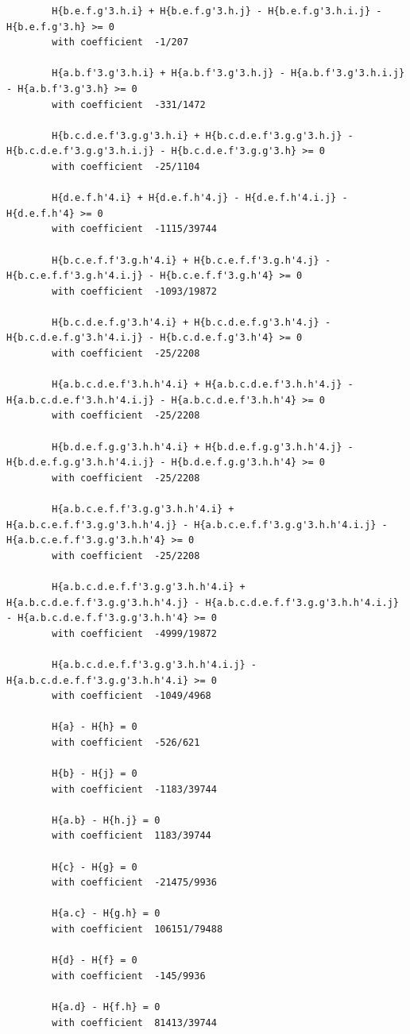 \documentclass[11pt, a4paper]{kybernetika}
\begin{document}
\begin{verbatim}
		H{b.e.f.g'3.h.i} + H{b.e.f.g'3.h.j} - H{b.e.f.g'3.h.i.j} - H{b.e.f.g'3.h} >= 0
		with coefficient  -1/207
		
		H{a.b.f'3.g'3.h.i} + H{a.b.f'3.g'3.h.j} - H{a.b.f'3.g'3.h.i.j} - H{a.b.f'3.g'3.h} >= 0
		with coefficient  -331/1472
		
		H{b.c.d.e.f'3.g.g'3.h.i} + H{b.c.d.e.f'3.g.g'3.h.j} - H{b.c.d.e.f'3.g.g'3.h.i.j} - H{b.c.d.e.f'3.g.g'3.h} >= 0
		with coefficient  -25/1104
		
		H{d.e.f.h'4.i} + H{d.e.f.h'4.j} - H{d.e.f.h'4.i.j} - H{d.e.f.h'4} >= 0
		with coefficient  -1115/39744
		
		H{b.c.e.f.f'3.g.h'4.i} + H{b.c.e.f.f'3.g.h'4.j} - H{b.c.e.f.f'3.g.h'4.i.j} - H{b.c.e.f.f'3.g.h'4} >= 0
		with coefficient  -1093/19872
		
		H{b.c.d.e.f.g'3.h'4.i} + H{b.c.d.e.f.g'3.h'4.j} - H{b.c.d.e.f.g'3.h'4.i.j} - H{b.c.d.e.f.g'3.h'4} >= 0
		with coefficient  -25/2208
		
		H{a.b.c.d.e.f'3.h.h'4.i} + H{a.b.c.d.e.f'3.h.h'4.j} - H{a.b.c.d.e.f'3.h.h'4.i.j} - H{a.b.c.d.e.f'3.h.h'4} >= 0
		with coefficient  -25/2208
		
		H{b.d.e.f.g.g'3.h.h'4.i} + H{b.d.e.f.g.g'3.h.h'4.j} - H{b.d.e.f.g.g'3.h.h'4.i.j} - H{b.d.e.f.g.g'3.h.h'4} >= 0
		with coefficient  -25/2208
		
		H{a.b.c.e.f.f'3.g.g'3.h.h'4.i} + H{a.b.c.e.f.f'3.g.g'3.h.h'4.j} - H{a.b.c.e.f.f'3.g.g'3.h.h'4.i.j} - H{a.b.c.e.f.f'3.g.g'3.h.h'4} >= 0
		with coefficient  -25/2208
		
		H{a.b.c.d.e.f.f'3.g.g'3.h.h'4.i} + H{a.b.c.d.e.f.f'3.g.g'3.h.h'4.j} - H{a.b.c.d.e.f.f'3.g.g'3.h.h'4.i.j} - H{a.b.c.d.e.f.f'3.g.g'3.h.h'4} >= 0
		with coefficient  -4999/19872
		
		H{a.b.c.d.e.f.f'3.g.g'3.h.h'4.i.j} - H{a.b.c.d.e.f.f'3.g.g'3.h.h'4.i} >= 0
		with coefficient  -1049/4968
		
		H{a} - H{h} = 0
		with coefficient  -526/621
		
		H{b} - H{j} = 0
		with coefficient  -1183/39744
		
		H{a.b} - H{h.j} = 0
		with coefficient  1183/39744
		
		H{c} - H{g} = 0
		with coefficient  -21475/9936
		
		H{a.c} - H{g.h} = 0
		with coefficient  106151/79488
		
		H{d} - H{f} = 0
		with coefficient  -145/9936
		
		H{a.d} - H{f.h} = 0
		with coefficient  81413/39744
		

\end{verbatim}
\end{document}
